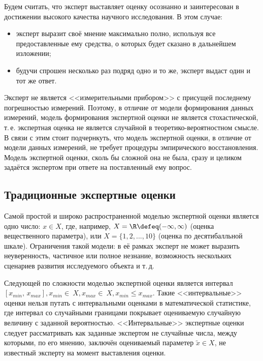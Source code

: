 


Будем считать, что эксперт выставляет оценку осознанно и заинтересован в достижении высокого качества научного исследования. В этом случае:
\begin{itemize}
 \item эксперт выразит своё мнение максимально полно, используя все предоставленные ему средства, о которых будет сказано в дальнейшем изложении;
 \item будучи спрошен несколько раз подряд одно и то же, эксперт выдаст один и тот же ответ. 
\end{itemize}

Эксперт не является <<измерительными прибором>> с присущей последнему погрешностью измерений. Поэтому, в отличие от модели формирования данных измерений, модель формирования экспертной оценки не является стохастической, т.\,е. экспертная оценка не является случайной в теоретико-вероятностном смысле. В связи с этим стоит подчернкуть, что модель экспертной оценки, в отличие от модели данных измерений, не требует процедуры эмпирического восстановления. Модель экспертной оценки, сколь бы сложной она не была, сразу и целиком задаётся экспертом при ответе на поставленный ему вопрос.

\subsection{Традиционные экспертные оценки}

Самой простой и широко распространенной моделью экспертной оценки является одно число: $x \in X$, где, например, $X = \R \defeq (-\infty, \infty)$ (оценка вещественного параметра), или $X = \{1, 2, ..., 10\}$ (оценка по десятибалльной шкале). Ограничения такой модели: в её рамках эксперт не может выразить неуверенность, частичное или полное незнание, возможность нескольких сценариев развития исследуемого объекта и т.\,д.

Следующей по сложности моделью экспертной оценки является интервал $[x_{min},\,x_{max}], {x_{min} \in~X}, {x_{max} \in~X}, {x_{min} \leq x_{max}}$. Такие <<интервальные>> оценки нельзя путать с интервальными оценками в математической статистике, где интервал со случайными границами покрывает оцениваемую случайную величину с заданной вероятностью. <<Интервальные>> экспертные оценки следует рассматривать как заданные экспертом не случайные числа, между которыми, по его мнению, заключён оцениваемый параметер $\tilde x \in X$, не известный эксперту на момент выставления оценки. 

